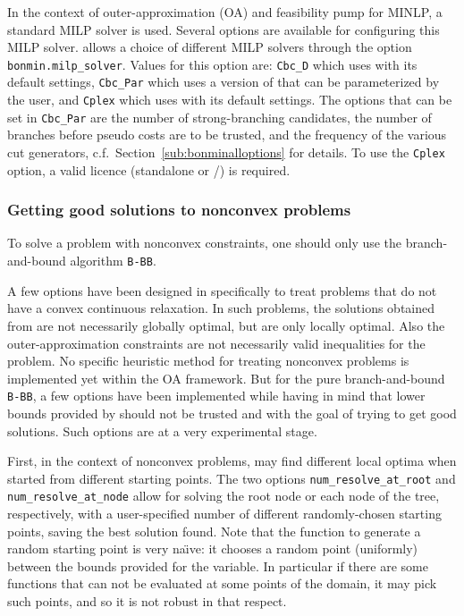 In the context of outer-approximation (OA) and feasibility pump for MINLP, a standard MILP solver is used.
Several options are available for configuring this MILP solver.
\BONMIN allows a choice of different MILP solvers through the option
\texttt{bonmin.milp\_sol\-ver}. Values for this option are: {\tt Cbc\_D} which uses \CBC with its
default settings, {\tt Cbc\_Par} which uses a version of \CBC that can be parameterized by the user, and \texttt{Cplex} which uses \CPLEX with its default settings.
The options that can be set in {\tt Cbc\_Par} are the number of strong-branching candidates,
the number of branches before pseudo costs are to be trusted, and the frequency of the various cut generators, c.f.\ Section~\ref{sub:bonminalloptions} for details.
To use the \texttt{Cplex} option, a valid \CPLEX licence (standalone or \GAMS/\CPLEX) is required.

\subsubsection{Getting good solutions to nonconvex problems}
To solve a problem with nonconvex constraints, one should only use the branch-and-bound algorithm {\tt B-BB}.

A few options have been designed in \BONMIN specifically to treat
problems that do not have a convex continuous relaxation.
In such problems, the solutions obtained from \IPOPT are
not necessarily globally optimal, but are only locally optimal.
Also the outer-approximation constraints are not necessarily valid inequalities for the problem.
No specific heuristic method for treating nonconvex problems is implemented
yet within the OA framework.
But for the pure branch-and-bound {\tt B-BB}, a few options have been implemented while having
in mind that lower bounds provided by \IPOPT should not be trusted and with the goal of
trying to get good solutions. Such options are at a very experimental stage.

First, in the context of nonconvex problems, \IPOPT may find different local optima when started
from different starting points. The two options {\tt num\_re\-solve\_at\_root} and {\tt num\_resolve\_at\_node}
allow for solving the root node or each node of the tree, respectively, with a user-specified
number of different randomly-chosen starting points, saving the best solution found.
Note that the function to generate a random starting point is very na\"{\i}ve:
it chooses a random point (uniformly) between the bounds provided for the variable.
In particular if there are some functions that can not be evaluated at some points of the domain, it may pick such points,
and so it is not robust in that respect.

